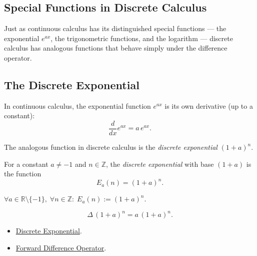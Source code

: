 
\subsection{Special Functions in Discrete Calculus}
\label{sec:special-functions}

Just as continuous calculus has its distinguished special functions ---
the exponential \(e^{ax}\), the trigonometric functions, and the logarithm
--- discrete calculus has analogous functions that behave simply under the
difference operator.

\subsection*{The Discrete Exponential}

In continuous calculus, the exponential function \(e^{ax}\) is its own
derivative (up to a constant):
\[
\frac{d}{dx} e^{ax} = a\, e^{ax}.
\]

The analogous function in discrete calculus is the \emph{discrete
exponential} \((1+a)^n\).

\begin{definition}
\label{def:discrete-exponential}
For a constant \(a \ne -1\) and \(n \in \mathbb{Z}\), the
\emph{discrete exponential} with base \((1+a)\) is the function
\[
E_a(n) = (1+a)^n.
\]
\end{definition}

\NoLocalDependencies

\begin{remark*}
\(\forall a \in \mathbb{R}\setminus\{-1\},\; \forall n \in \mathbb{Z}:\;
E_a(n) := (1+a)^n\).
\end{remark*}

\begin{proposition}
\label{prop:discrete-exponential-rule}
\[
\Delta\,(1+a)^n = a\,(1+a)^n.
\]
\end{proposition}

\begin{dependencies}
\begin{itemize}
  \item \hyperref[def:discrete-exponential]{Discrete Exponential}.
  \item \hyperref[def:forward-difference]{Forward Difference Operator}.
\end{itemize}
\end{dependencies}

